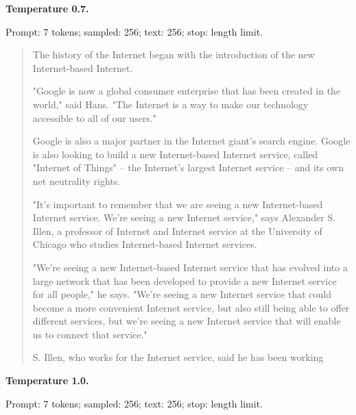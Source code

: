 
\textbf{Temperature 0.7.}

{\footnotesize Prompt: 7 tokens; sampled: 256; text: 256; stop: length limit.}

\begin{quote}\small

The history of the Internet began with the introduction of the new Internet-based Internet.

"Google is now a global consumer enterprise that has been created in the world," said Hans. "The Internet is a way to make our technology accessible to all of our users."

Google is also a major partner in the Internet giant's search engine. Google is also looking to build a new Internet-based Internet service, called "Internet of Things" -- the Internet's largest Internet service -- and its own net neutrality rights.

"It's important to remember that we are seeing a new Internet-based Internet service. We're seeing a new Internet service," says Alexander S. Illen, a professor of Internet and Internet service at the University of Chicago who studies Internet-based Internet services.

"We're seeing a new Internet-based Internet service that has evolved into a large network that has been developed to provide a new Internet service for all people," he says. "We're seeing a new Internet service that could become a more convenient Internet service, but also still being able to offer different services, but we're seeing a new Internet service that will enable us to connect that service."

S. Illen, who works for the Internet service, said he has been working

\end{quote}


\textbf{Temperature 1.0.}

{\footnotesize Prompt: 7 tokens; sampled: 256; text: 256; stop: length limit.}

